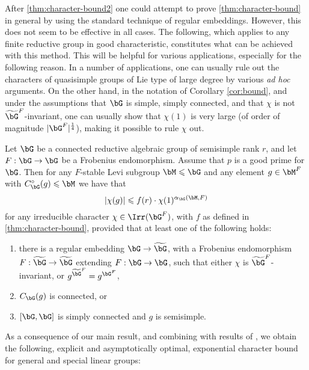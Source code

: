 \documentclass[eqthmnum,nocolour,skinny]{jt-calcs}
\begin{document}
\begin{pa}
After \cref{thm:character-bound2} one could attempt to prove \cref{thm:character-bound} in general by using the standard technique of regular embeddings. However, this does not seem to be effective in all cases. The following, which applies to any finite reductive group in good characteristic, constitutes what can be achieved with this method. This will be helpful for various applications, especially for the following reason. In a number of applications, one can usually rule out the characters of quasisimple groups of Lie type of large degree by various {\it ad hoc} arguments. On the other hand, in the notation of Corollary \ref{cor:bound}, and under the assumptions that $\bG$ is simple, simply connected, and that $\chi$ is not $\widetilde{\bG}^F$-invariant, one can usually show that $\chi(1)$ is very large (of order of magnitude $|\bG^F|^{\frac{1}{4}}$), making it possible to rule $\chi$ out. 
\end{pa}

\begin{cor}\label{cor:bound}
Let $\bG$ be a connected reductive algebraic group of semisimple rank $r$, and let $F : \bG \to \bG$ be a Frobenius endomorphism. Assume that $p$ is a good prime for $\bG$. Then for any $F$-stable Levi subgroup $\bM \leqslant \bG$ and any element $g \in \bM^F$ with $C_{\bG}^{\circ}(g) \leqslant \bM$ we have that
\begin{equation*}
|\chi(g)| \leqslant f(r)\cdot\chi(1)^{\alpha_{\bG}(\bM,F)}
\end{equation*}
for any irreducible character $\chi \in \Irr(\bG^F)$, with $f$ as defined in \cref{thm:character-bound}, provided that at least one of the following holds:
\begin{enumerate}
\item there is a regular embedding $\bG \to \widetilde{\bG}$, with a Frobenius endomorphism $F: \widetilde{\bG} \to \widetilde{\bG}$ extending $F: \bG \to \bG$, such that either $\chi$ is $\widetilde{\bG}^F$-invariant, or $g^{\widetilde{\bG}^F} = g^{\bG^F}$,
\item $C_\bG(g)$ is connected, or
\item $[\bG,\bG]$ is simply connected and $g$ is semisimple.
\end{enumerate}
\end{cor}

As a consequence of our main result, and combining with results of \cite{bezrukavnikov-liebeck-shalev-tiep:2017:character-bounds-grps-Lie-type}, we obtain the following, explicit and asymptotically optimal, exponential character bound for general and special linear groups:
\end{document}
